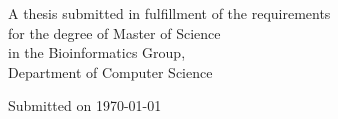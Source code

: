 \begin{titlepage}
\begin{center}
 		
 	\vspace{1.5cm}
 		
 		\large {A thesis submitted in fulfillment of the requirements\\ for the degree of Master of Science\\
 		in the Bioinformatics Group,\\	Department of Computer Science} %
 	
 	\vspace{0.9cm}
 		
 		{\large {Submitted on \today}}%
 		
 		\vfill
 		
 	\end{center}
 \end{titlepage}
 